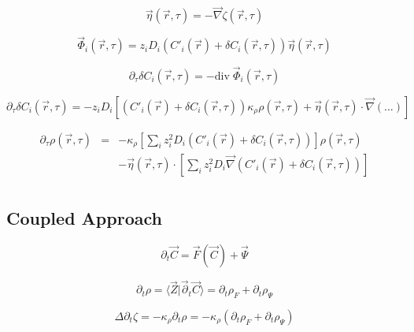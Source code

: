 \documentclass[aps,12pt]{revtex4}
\begin{document}
\begin{equation}
	\vec \eta(\vec r, \tau) = - \vec \nabla \zeta(\vec r,\tau)
\end{equation}

\begin{equation}
	\vec \Phi_i(\vec r,\tau) = z_i D_i \left(   C'_i (\vec r) + \delta  C_i(\vec r,\tau) \right) \vec \eta(\vec r, \tau)
\end{equation}

\begin{equation}
	\partial_\tau \delta   C_i(\vec r, \tau) = - \mathrm{div} \; \vec \Phi_i (\vec r,\tau)
\end{equation}


\begin{equation}
	\partial_\tau \delta   C_i(\vec r, \tau) 
	= - z_i D_i 
	\left[
	\left( C'_i (\vec r) + \delta  C_i(\vec r,\tau) \right) \kappa_\rho \rho(\vec r,\tau)
	+ \vec \eta(\vec r,\tau) \cdot \vec \nabla \left( \ldots \right)
	\right]
\end{equation}

\begin{equation}
\begin{array}{rcl}
	\partial_\tau   \rho(\vec r, \tau) &
	= & - \kappa_\rho \left[ \sum_i z_i^2 D_i \left( C'_i (\vec r) + \delta  C_i(\vec r,\tau) \right) \right]   \rho(\vec r,\tau) \\
	 & & - \vec \eta(\vec r,\tau) \cdot \left[\sum_i z_i^2 D_i \vec\nabla \left( C'_i (\vec r) + \delta  C_i(\vec r,\tau) \right) \right]\\
\end{array}
\end{equation}

\subsection{Coupled Approach}

\begin{equation}
	\partial_t \vec C = \vec F ( \vec C ) + \vec \Psi
\end{equation}

\begin{equation}
	\partial_t \rho = \langle \vec Z \vert \vec \partial_t \vec C \rangle = \partial_t \rho_F + \partial_t \rho_\Psi
\end{equation}

\begin{equation}
	\Delta \partial_t \zeta = -\kappa_\rho \partial_t \rho = -\kappa_\rho ( \partial_t \rho_F + \partial_t \rho_\Psi)
\end{equation}
\end{document}
